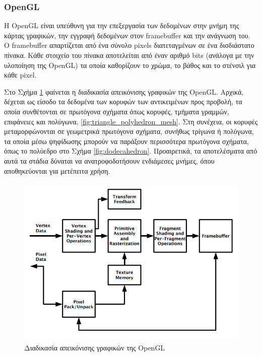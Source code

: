 \subsubsection{OpenGL}
\label{section:opengl_framebuffer}
Η OpenGL είναι υπεύθυνη για την επεξεργασία των δεδομένων στην μνήμη της κάρτας γραφικών, την εγγραφή δεδομένων στον framebuffer και την ανάγνωση του. Ο framebuffer απαρτίζεται από ένα σύνολο pixels διατεταγμένων σε ένα δισδιάστατο πίνακα. Κάθε στοιχείο του πίνακα αποτελείται από έναν αριθμό bits (ανάλογα με την υλοποίηση της OpenGL) τα οποία καθορίζουν το χρώμα, το βάθος και το στένσιλ για κάθε pixel.

Στο Σχήμα \ref{fig:opengl_pipeline} φαίνεται η διαδικασία απεικόνισης γραφικών της OpenGL. Αρχικά, δέχεται ως είσοδο τα δεδομένα των κορυφών των αντικειμένων προς προβολή, τα οποία συνθέτονται σε πρωτόγονα σχήματα όπως κορυφές, τμήματα γραμμών, επιφάνειες και πολύγωνα, \ref{fig:triangle_polyhedron_mesh}. Στη συνέχεια, οι κορυφές μεταμορφώνονται σε γεωμετρικά πρωτόγονα σχήματα, συνήθως τρίγωνα ή πολύγωνα, τα οποία μέσω ψηφίδωσης μπορούν να παράξουν περισσότερα πρωτόγονα σχήματα, όπως το πολύεδρο στο Σχήμα \ref{fig:dodecahedron}. Προαιρετικά, τα αποτελέσματα από αυτά τα στάδια δύναται να ανατροφοδοτήσουν ενδιάμεσες μνήμες, όπου αποθηκεύονται για μετέπειτα χρήση.

\begin{figure}[t]
	\centering
	\includegraphics[scale=2.2]{images/chapter2/opengl_pipeline.jpg}
	\caption{Διαδικασία απεικόνισης γραφικών της OpenGL}
	\label{fig:opengl_pipeline}
\end{figure}

